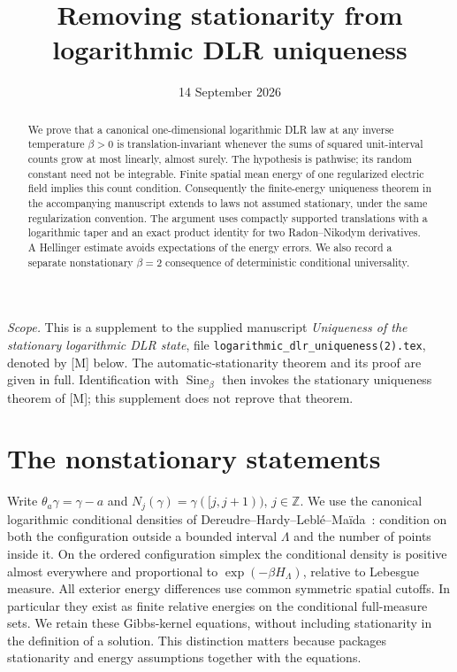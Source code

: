 \documentclass[11pt,reqno]{amsart}
\title[Removing stationarity from logarithmic DLR uniqueness]{Removing stationarity from logarithmic DLR uniqueness}
\date{14 September 2026}
\numberwithin{equation}{section}
\theoremstyle{definition}
\theoremstyle{remark}
\newcommand{\Z}{\mathbb Z}
\newcommand{\1}{\mathbf1}
\newcommand{\Sine}{\operatorname{Sine}}
\begin{document}
\begin{abstract}
We prove that a canonical one-dimensional logarithmic DLR law at any
inverse temperature $\beta>0$ is translation-invariant whenever the sums
of squared unit-interval counts grow at most linearly, almost surely.
The hypothesis is pathwise; its random constant need not be integrable.
Finite spatial mean energy of one regularized electric field implies this
count condition. Consequently the finite-energy uniqueness theorem in the
accompanying manuscript extends to laws not assumed stationary, under
the same regularization convention. The argument uses compactly supported
translations with a logarithmic taper and an exact product identity for
two Radon--Nikodym derivatives. A Hellinger estimate avoids expectations
of the energy errors. We also record a separate nonstationary
$\beta=2$ consequence of deterministic conditional universality.
\end{abstract}
\maketitle

\noindent\textit{Scope.}
This is a supplement to the supplied manuscript
\emph{Uniqueness of the stationary logarithmic DLR state}, file
\texttt{logarithmic\_dlr\_uniqueness(2).tex}, denoted by [M] below.
The automatic-stationarity theorem and its proof are given in full.
Identification with $\Sine_\beta$ then invokes the stationary uniqueness
theorem of [M]; this supplement does not reprove that theorem.

\section{The nonstationary statements}

Write $\theta_a\gamma=\gamma-a$ and
$N_j(\gamma)=\gamma([j,j+1))$, $j\in\Z$.
We use the canonical logarithmic conditional densities of
Dereudre--Hardy--Lebl\'e--Ma\"ida~\cite{DHLM}: condition on both the
configuration outside a bounded interval $\Lambda$ and the number of
points inside it. On the ordered configuration simplex the conditional
density is positive almost everywhere and proportional to
$\exp(-\beta H_\Lambda)$, relative to Lebesgue measure.
All exterior energy differences use common symmetric spatial cutoffs.
In particular they exist as finite relative energies on the conditional
full-measure sets. We retain these Gibbs-kernel equations, without
including stationarity in the definition of a solution. This distinction
matters because \cite[Definition 3.1]{DHLM} packages stationarity and
energy assumptions together with the equations.
\end{document}

